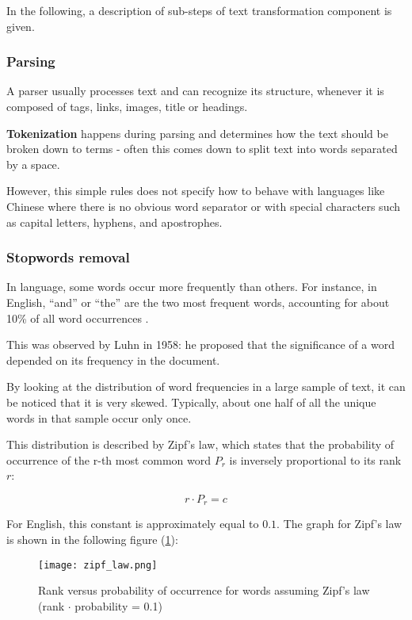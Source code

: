 In the following, a description of sub-steps of text transformation component is given.

\subsubsection{Parsing}

A parser usually processes text and can recognize its structure, whenever it is composed of tags, links, images, title or headings.

\textbf{Tokenization} happens during parsing and determines how the text should be broken down to terms - often this comes down to split text into words separated by a space.

However, this simple rules does not specify how to behave with languages like Chinese where there is no obvious word separator or with special characters such as capital letters, hyphens, and apostrophes.

\subsubsection{Stopwords removal}

In language, some words occur more frequently than others. For instance, in English, ``and'' or ``the'' are the two most frequent words, accounting for about 10\% of all word occurrences \cite{croftIR}.

This was observed by Luhn in 1958: he proposed that the significance of a word depended on its frequency in the document.

By looking at the distribution of word frequencies in a large sample of text, it can be noticed that it is very skewed. Typically, about one half of all the unique words in that sample occur only once.

This distribution is described by Zipf's law, which states that the probability of occurrence of the r-th most common word $P_r$ is inversely proportional to its rank $r$:

\begin{equation}
\tag{Zipf's law}
    r \cdot P_r = c
\end{equation}

For English, this constant is approximately equal to $0.1$. The graph for Zipf's law is shown in the following figure (\ref{fig:ziplaw}):

\begin{figure}[H]
  \centering
    \texttt{[image: zipf\_law.png]}
  \caption{Rank versus probability of occurrence for words assuming Zipf's law (rank $\cdot$ probability = 0.1)}
  \label{fig:ziplaw}
\end{figure}

